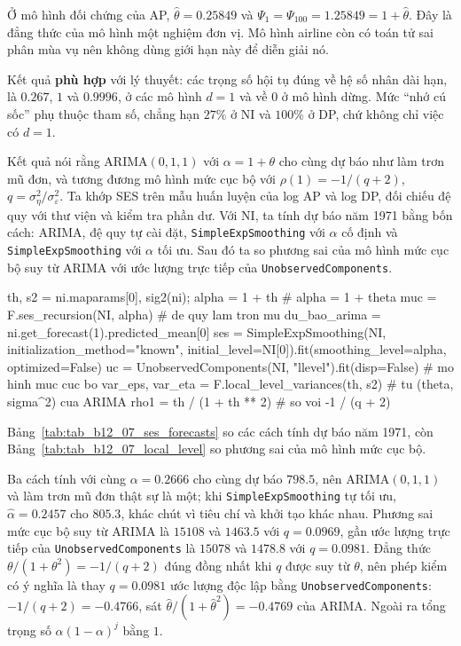 Ở mô hình đối chứng của AP, $\hat\theta=0.25849$ và $\Psi_1=\Psi_{100}=1.25849=1+\hat\theta$. Đây là đẳng thức của mô hình một nghiệm đơn vị. Mô hình airline còn có toán tử sai phân mùa vụ nên không dùng giới hạn này để diễn giải nó.

 Kết quả \textbf{phù hợp} với lý thuyết: các trọng số hội tụ đúng về hệ số nhân dài hạn, là $0.267$, $1$ và $0.9996$, ở các mô hình $d=1$ và về $0$ ở mô hình dừng. Mức ``nhớ cú sốc'' phụ thuộc tham số, chẳng hạn $27\%$ ở NI và $100\%$ ở DP, chứ không chỉ việc có $d=1$.

 Kết quả  nói rằng ARIMA$(0,1,1)$ với $\alpha=1+\theta$ cho cùng dự báo như làm trơn mũ đơn, và tương đương mô hình mức cục bộ với $\rho(1)=-1/(q+2)$, $q=\sigma_\eta^2/\sigma_\varepsilon^2$.
 Ta khớp SES trên mẫu huấn luyện của log AP và log DP, đối chiếu đệ quy với thư viện và kiểm tra phần dư. Với NI, ta tính dự báo năm 1971 bằng bốn cách: ARIMA, đệ quy tự cài đặt, \texttt{SimpleExpSmoothing} với $\alpha$ cố định và \texttt{SimpleExpSmoothing} với $\alpha$ tối ưu. Sau đó ta so phương sai của mô hình mức cục bộ suy từ ARIMA với ước lượng trực tiếp của \texttt{UnobservedComponents}.
\begin{codeblock}
th, s2 = ni.maparams[0], sig2(ni); alpha = 1 + th                # alpha = 1 + theta
muc = F.ses_recursion(NI, alpha)                                 # de quy lam tron mu
du_bao_arima = ni.get_forecast(1).predicted_mean[0]
ses = SimpleExpSmoothing(NI, initialization_method="known",
                         initial_level=NI[0]).fit(smoothing_level=alpha, optimized=False)
uc = UnobservedComponents(NI, "llevel").fit(disp=False)          # mo hinh muc cuc bo
var_eps, var_eta = F.local_level_variances(th, s2)               # tu (theta, sigma^2) cua ARIMA
rho1 = th / (1 + th ** 2)                                        # so voi -1 / (q + 2)
\end{codeblock}
 Bảng~\ref{tab:tab_b12_07_ses_forecasts} so các cách tính dự báo năm 1971, còn Bảng~\ref{tab:tab_b12_07_local_level} so phương sai của mô hình mức cục bộ.


 Ba cách tính với cùng $\alpha=0.2666$ cho cùng dự báo $798.5$, nên ARIMA$(0,1,1)$ và làm trơn mũ đơn thật sự là một; khi \texttt{SimpleExpSmoothing} tự tối ưu, $\hat\alpha=0.2457$ cho $805.3$, khác chút vì tiêu chí và khởi tạo khác nhau. Phương sai mức cục bộ suy từ ARIMA là $15108$ và $1463.5$ với $q=0.0969$, gần ước lượng trực tiếp của \texttt{UnobservedComponents} là $15078$ và $1478.8$ với $q=0.0981$. Đẳng thức $\theta/(1+\theta^2)=-1/(q+2)$ đúng đồng nhất khi $q$ được suy từ $\theta$, nên phép kiểm có ý nghĩa là thay $q=0.0981$ ước lượng độc lập bằng \texttt{UnobservedComponents}: $-1/(q+2)=-0.4766$, sát $\hat\theta/(1+\hat\theta^2)=-0.4769$ của ARIMA. Ngoài ra tổng trọng số $\alpha(1-\alpha)^j$ bằng $1$.

